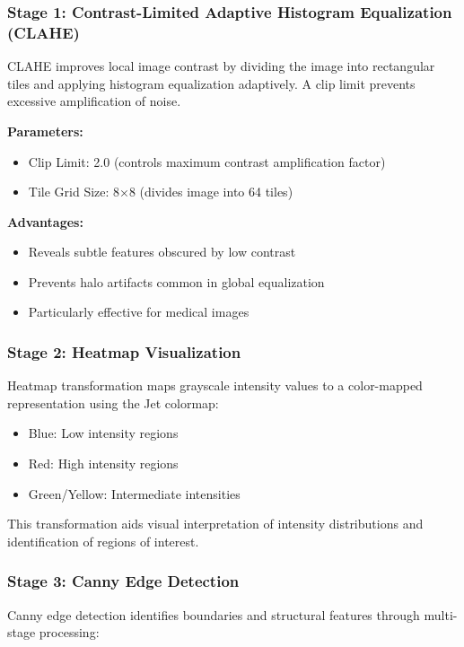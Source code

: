 \documentclass[12pt,a4paper]{article}
\begin{document}
\subsubsection{Stage 1: Contrast-Limited Adaptive Histogram Equalization (CLAHE)}

CLAHE improves local image contrast by dividing the image into rectangular tiles and applying histogram equalization adaptively. A clip limit prevents excessive amplification of noise.

\textbf{Parameters:}
\begin{itemize}
    \item Clip Limit: 2.0 (controls maximum contrast amplification factor)
    \item Tile Grid Size: 8×8 (divides image into 64 tiles)
\end{itemize}

\textbf{Advantages:}
\begin{itemize}
    \item Reveals subtle features obscured by low contrast
    \item Prevents halo artifacts common in global equalization
    \item Particularly effective for medical images
\end{itemize}

\subsubsection{Stage 2: Heatmap Visualization}

Heatmap transformation maps grayscale intensity values to a color-mapped representation using the Jet colormap:
\begin{itemize}
    \item Blue: Low intensity regions
    \item Red: High intensity regions
    \item Green/Yellow: Intermediate intensities
\end{itemize}

This transformation aids visual interpretation of intensity distributions and identification of regions of interest.

\subsubsection{Stage 3: Canny Edge Detection}

Canny edge detection identifies boundaries and structural features through multi-stage processing:
\end{document}
